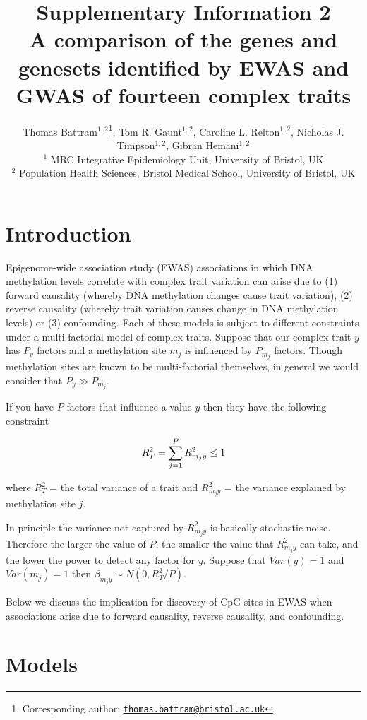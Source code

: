 \documentclass[
]{article}
\title{Supplementary Information 2\\
A comparison of the genes and genesets identified by EWAS and GWAS of fourteen complex traits}
\author{Thomas Battram\(^{1,}\)\(^2\)\footnote{Corresponding author: \href{mailto:thomas.battram@bristol.ac.uk}{\nolinkurl{thomas.battram@bristol.ac.uk}}}, Tom R. Gaunt\(^{1,}\)\(^2\), Caroline L. Relton\(^{1,}\)\(^2\), Nicholas J. Timpson\(^{1,}\)\(^2\), Gibran Hemani\(^{1,}\)\(^2\)\\
\(^1\) MRC Integrative Epidemiology Unit, University of Bristol, UK\\
\(^2\) Population Health Sciences, Bristol Medical School, University of Bristol, UK}
\date{}
\begin{document}
\maketitle

{
\setcounter{tocdepth}{2}
\tableofcontents
}
\hypertarget{introduction}{%
\section{Introduction}\label{introduction}}

Epigenome-wide association study (EWAS) associations in which DNA methylation levels correlate with complex trait variation can arise due to (1) forward causality (whereby DNA methylation changes cause trait variation), (2) reverse causality (whereby trait variation causes change in DNA methylation levels) or (3) confounding. Each of these models is subject to different constraints under a multi-factorial model of complex traits. Suppose that our complex trait \(y\) has \(P_y\) factors and a methylation site \(m_j\) is influenced by \(P_{m_j}\) factors. Though methylation sites are known to be multi-factorial themselves, in general we would consider that \(P_y \gg P_{m_j}\).

If you have \(P\) factors that influence a value \(y\) then they have the following constraint

\begin{equation}
  R^2_T = \sum^P_{j=1} R^2_{m_jy} \leq 1 \notag
  \label{eq:r2-constraint}
\end{equation}

where \(R^2_T\) = the total variance of a trait and \(R^2_{m_jy}\) = the variance explained by methylation site \(j\).

In principle the variance not captured by \(R^2_{m_jy}\) is basically stochastic noise. Therefore the larger the value of \(P\), the smaller the value that \(R^2_{m_jy}\) can take, and the lower the power to detect any factor for \(y\). Suppose that \(Var(y) = 1\) and \(Var(m_j) = 1\) then \(\beta_{m_jy} \sim N(0, R^2_T/P)\).

Below we discuss the implication for discovery of CpG sites in EWAS when associations arise due to forward causality, reverse causality, and confounding.

\newpage

\hypertarget{models}{%
\section{Models}\label{models}}
\end{document}
